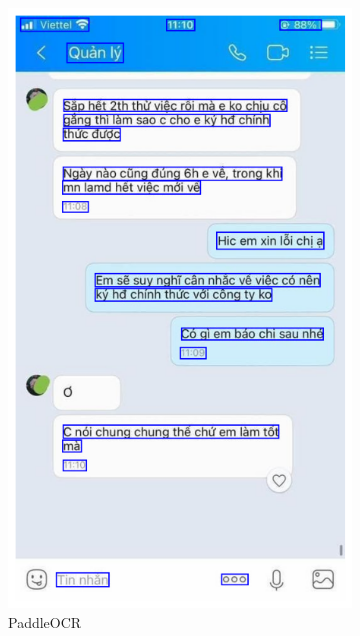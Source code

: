 \documentclass[11pt]{article}
\begin{document}
\begin{figure}[h!]
    \centering
    \begin{subfigure}{0.3\linewidth}
        \includegraphics[width=\linewidth]{__results___10_1.png}
        \caption{PaddleOCR}
    \end{subfigure}
    \hfill
    \begin{subfigure}{0.3\linewidth}

\end{subfigure}
\end{figure}
\end{document}
